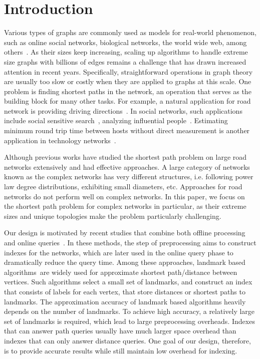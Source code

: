 \section{Introduction}
\label{introduction}

Various types of graphs are commonly used as models for real-world phenomenon, such as online social networks, biological networks, the world wide web, among others~\cite{newman2010networks}. As their sizes keep increasing, scaling up algorithms to handle extreme size graphs with billions of edges remains a challenge that has drawn increased attention in recent years. Specifically, straightforward operations in graph theory are usually too slow or costly when they are applied to graphs at this scale. One problem is finding shortest paths in the network, an operation that serves as the building block for many other tasks. For example, a natural application for road network is providing driving directions~\cite{Abraham:2011:HLA:2008623.2008645}. In social networks, such applications include social sensitive search~\cite{Vieira:2007:ESR:1321440.1321520}, analyzing influential people~\cite{Kempe:2003:MSI:956750.956769}. Estimating minimum round trip time between hosts without direct measurement is another application in technology networks~\cite{Tang:2003:VLI:948205.948223}.

Although previous works have studied the shortest path problem on large road networks extensively and had effective approaches. A large category of networks known as the complex networks has very different structures, i.e. following power law degree distributions, exhibiting small diameters, etc. Approaches for road networks do not perform well on complex networks. In this paper, we focus on the shortest path problem for complex networks in particular, as their extreme sizes and unique topologies make the problem particularly challenging.

Our design is motivated by recent studies that combine both offline processing and online queries~\cite{Potamias:2009:FSP:1645953.1646063, tretyakov2011fast, Akiba:2012:SQC:2247596.2247614, 6399472, Jin:2012:HLA:2213836.2213887}. In these methods, the step of preprocessing aims to construct indexes for the networks, which are later used in the online query phase to dramatically reduce the query time. Among these approaches, landmark based algorithms~\cite{Thorup:2005:ADO:1044731.1044732, Goldberg:2005:CSP:1070432.1070455, Potamias:2009:FSP:1645953.1646063, Gubichev:2010:FAE:1871437.1871503, tretyakov2011fast, 6399472}are widely used for approximate shortest path/distance between vertices. Such algorithms select a small set of landmarks, and construct an index that consists of labels for each vertex, that store distances or shortest paths to landmarks. The approximation accuracy of landmark based algorithms heavily depends on the number of landmarks. To achieve high accuracy, a relatively large set of landmarks is required, which lead to large preprocessing overheads. Indexes that can answer path queries usually have much larger space overhead than indexes that can only answer distance queries. One goal of our design, therefore, is to provide accurate results while still maintain low overhead for indexing.

